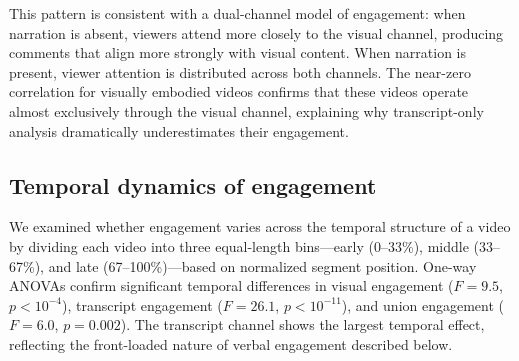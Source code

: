 \documentclass[fleqn,10pt]{wlscirep}
\begin{document}
This pattern is consistent with a dual-channel model of engagement: when narration is absent, viewers attend more closely to the visual channel, producing comments that align more strongly with visual content. When narration is present, viewer attention is distributed across both channels. The near-zero correlation for visually embodied videos confirms that these videos operate almost exclusively through the visual channel, explaining why transcript-only analysis dramatically underestimates their engagement.


\subsection*{Temporal dynamics of engagement}

We examined whether engagement varies across the temporal structure of a video by dividing each video into three equal-length bins---early (0--33\%), middle (33--67\%), and late (67--100\%)---based on normalized segment position. One-way ANOVAs confirm significant temporal differences in visual engagement ($F = 9.5$, $p < 10^{-4}$), transcript engagement ($F = 26.1$, $p < 10^{-11}$), and union engagement ($F = 6.0$, $p = 0.002$). The transcript channel shows the largest temporal effect, reflecting the front-loaded nature of verbal engagement described below.
\end{document}
